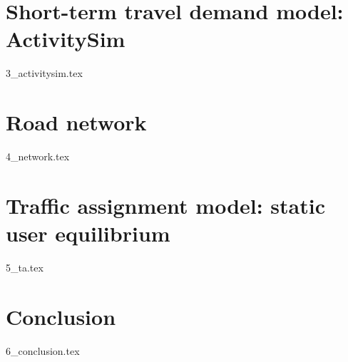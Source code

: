 \documentclass{report}
\begin{document}
\section{Short-term travel demand model: ActivitySim}
{3_activitysim.tex}

\section{Road network}
{4_network.tex}

\section{Traffic assignment model: static user equilibrium}
{5_ta.tex}

\section{Conclusion}
{6_conclusion.tex}

\printbibliography[title=References]
\end{document}
